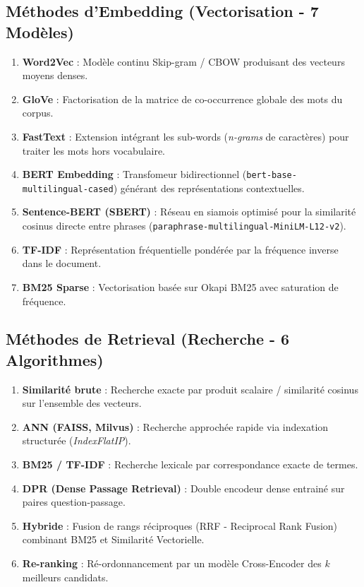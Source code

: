 \documentclass[12pt,a4paper,oneside]{report}
\begin{document}
\subsection{Méthodes d'Embedding (Vectorisation - 7 Modèles)}
\begin{enumerate}
    \item \textbf{Word2Vec} : Modèle continu Skip-gram / CBOW produisant des vecteurs moyens denses.
    \item \textbf{GloVe} : Factorisation de la matrice de co-occurrence globale des mots du corpus.
    \item \textbf{FastText} : Extension intégrant les sub-words (\textit{n-grams} de caractères) pour traiter les mots hors vocabulaire.
    \item \textbf{BERT Embedding} : Transfomeur bidirectionnel (\texttt{bert-base-multilingual-cased}) générant des représentations contextuelles.
    \item \textbf{Sentence-BERT (SBERT)} : Réseau en siamois optimisé pour la similarité cosinus directe entre phrases (\texttt{paraphrase-multilingual-MiniLM-L12-v2}).
    \item \textbf{TF-IDF} : Représentation fréquentielle pondérée par la fréquence inverse dans le document.
    \item \textbf{BM25 Sparse} : Vectorisation basée sur Okapi BM25 avec saturation de fréquence.
\end{enumerate}

\subsection{Méthodes de Retrieval (Recherche - 6 Algorithmes)}
\begin{enumerate}
    \item \textbf{Similarité brute} : Recherche exacte par produit scalaire / similarité cosinus sur l'ensemble des vecteurs.
    \item \textbf{ANN (FAISS, Milvus)} : Recherche approchée rapide via indexation structurée (\textit{IndexFlatIP}).
    \item \textbf{BM25 / TF-IDF} : Recherche lexicale par correspondance exacte de termes.
    \item \textbf{DPR (Dense Passage Retrieval)} : Double encodeur dense entrainé sur paires question-passage.
    \item \textbf{Hybride} : Fusion de rangs réciproques (RRF - Reciprocal Rank Fusion) combinant BM25 et Similarité Vectorielle.
    \item \textbf{Re-ranking} : Ré-ordonnancement par un modèle Cross-Encoder des $k$ meilleurs candidats.
\end{enumerate}
\end{document}
